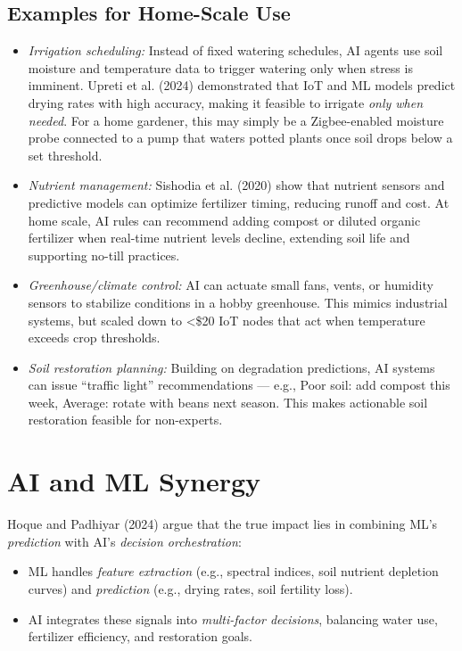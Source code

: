 \documentclass{sigchi}
\begin{document}
\subsection{Examples for Home-Scale Use}

\begin{itemize}
	\item \emph{Irrigation scheduling:} Instead of fixed watering schedules, AI agents use soil moisture and temperature data to trigger watering only when stress is imminent. Upreti et al. (2024) demonstrated that IoT and ML models predict drying rates with high accuracy, making it feasible to irrigate \emph{only when needed}. For a home gardener, this may simply be a Zigbee-enabled moisture probe connected to a pump that waters potted plants once soil drops below a set threshold.
	\item \emph{Nutrient management:} Sishodia et al. (2020) show that nutrient sensors and predictive models can optimize fertilizer timing, reducing runoff and cost. At home scale, AI rules can recommend adding compost or diluted organic fertilizer when real-time nutrient levels decline, extending soil life and supporting no-till practices.
	\item \emph{Greenhouse/climate control:} AI can actuate small fans, vents, or humidity sensors to stabilize conditions in a hobby greenhouse. This mimics industrial systems, but scaled down to <\$20 IoT nodes that act when temperature exceeds crop thresholds.
	\item \emph{Soil restoration planning:} Building on degradation predictions, AI systems can issue “traffic light” recommendations — e.g., Poor soil: add compost this week, Average: rotate with beans next season. This makes actionable soil restoration feasible for non-experts.
\end{itemize}

\section{AI and ML Synergy}

Hoque and Padhiyar (2024) argue that the true impact lies in combining ML’s \emph{prediction} with AI’s \emph{decision orchestration}:
\begin{itemize}
\item ML handles \emph{feature extraction} (e.g., spectral indices, soil nutrient depletion curves) and \emph{prediction} (e.g., drying rates, soil fertility loss).
\item AI integrates these signals into \emph{multi-factor decisions}, balancing water use, fertilizer efficiency, and restoration goals.
\end{itemize}
\end{document}
